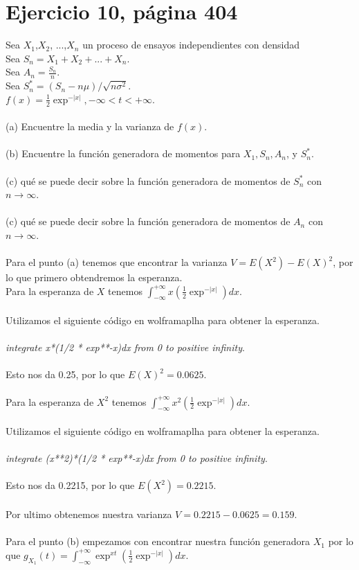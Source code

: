 \documentclass[]{article}
\begin{document}
\section{Ejercicio 10, página 404}
Sea $X_{1}$,$X_{2}$, ...,$X_{n}$ un proceso de ensayos independientes con densidad\\
Sea $S_{n} = X_{1} + X_{2} + ... + X_{n}$.\\
Sea $A_{n} = \frac{S_{n}}{n}$.\\
Sea $S_{n}^{*} = (S_{n} - n\mu)/\sqrt{n\sigma ^{2}}$.\\
$f(x) = \frac{1}{2}\exp^{-|x|}, -\infty < t < +\infty$.\\
\\
(a) Encuentre la media y la varianza de $f(x)$.\\
\\
(b) Encuentre la función generadora de momentos para  $X_{1}, S_{n}, A_{n}$, y $S_{n}^{*}$.\\
\\
(c) qué se puede decir sobre la función generadora de momentos de $S_{n}^{*}$ con $n \rightarrow \infty$.\\
\\
(c) qué se puede decir sobre la función generadora de momentos de $A_{n}$ con $n \rightarrow \infty$.\\
\\
Para el punto (a) tenemos que encontrar la varianza $V = E(X^{2}) - E(X)^{2}$, por lo que primero obtendremos la esperanza.\\
Para la esperanza de $X$ tenemos $\int_{-\infty}^{+\infty}x(\frac{1}{2}\exp^{-|x|})dx$.\\
\\
Utilizamos el siguiente código en wolframaplha para obtener la esperanza.\\
\\
\textit{integrate x*(1/2 * exp**-x)dx from 0 to positive infinity}.\\
\\
Esto nos da 0.25, por lo que $E(X)^2 = 0.0625$.\\
\\
Para la esperanza de $X^2$ tenemos $\int_{-\infty}^{+\infty}x^2(\frac{1}{2}\exp^{-|x|})dx$.\\
\\
Utilizamos el siguiente código en wolframaplha para obtener la esperanza.\\
\\
\textit{integrate (x**2)*(1/2 * exp**{-x})dx from 0 to positive infinity}.\\
\\
Esto nos da 0.2215, por lo que $E(X^2) = 0.2215$.\\
\\
Por ultimo obtenemos nuestra varianza $V = 0.2215 - 0.0625 = 0.159$.\\
\\
Para el punto (b) empezamos con encontrar nuestra función generadora $X_{1}$ por lo que $g_{X_{1}}(t) = \int_{-\infty}^{+\infty} \exp^{xt}(\frac{1}{2}\exp^{-|x|})dx$.\\

\hfill
\printbibliography[title={Referencias}]
\end{document}
